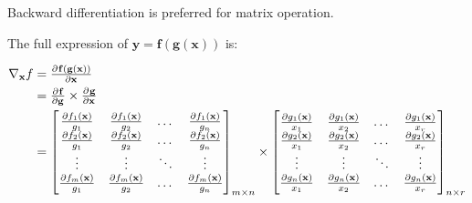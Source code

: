 Backward differentiation is preferred for matrix operation.



The full expression of $\mathbf{y}=\mathbf{f}(\mathbf{g}(\mathbf{x}))$ is:

\begin{equation}
\begin{aligned}
	\nabla{}_{\mathbf{x}} f &=  \pd{\mathbf{f}(\mathbf{g}(\mathbf{x}))}{\mathbf{x}} \\
	&= \pd{\mathbf{f}}{\mathbf{g}} \times \pd{\mathbf{g}}{\mathbf{x}} \\
	&= \mleft [ \begin{matrix}
\frac{\partial f_1({\mathbf{x}})}{g_1} & \frac{\partial f_1({\mathbf{x}})}{g_2} & \dots & \frac{\partial f_1({\mathbf{x}})}{g_n} \\
\frac{\partial f_2({\mathbf{x}})}{g_1} & \frac{\partial f_2({\mathbf{x}})}{g_2} & \dots & \frac{\partial f_2({\mathbf{x}})}{g_n} \\
\vdots & \vdots & \ddots & \vdots  \\
\frac{\partial f_m({\mathbf{x}})}{g_1} & \frac{\partial f_m({\mathbf{x}})}{g_2} & \dots & \frac{\partial f_m({\mathbf{x}})}{g_n}
\end{matrix} \mright ]_{m \times n}
\times %
\mleft [ \begin{matrix}
\frac{\partial g_1({\mathbf{x}})}{x_1} & \frac{\partial g_1({\mathbf{x}})}{x_2} & \dots & \frac{\partial g_1({\mathbf{x}})}{x_r} \\
\frac{\partial g_2({\mathbf{x}})}{x_1} & \frac{\partial g_2({\mathbf{x}})}{x_2} & \dots & \frac{\partial g_2({\mathbf{x}})}{x_r} \\
\vdots & \vdots & \ddots & \vdots  \\
\frac{\partial g_n({\mathbf{x}})}{x_1} & \frac{\partial g_n({\mathbf{x}})}{x_2} & \dots & \frac{\partial g_n({\mathbf{x}})}{x_r}
\end{matrix} \mright ]_{n \times r}
\end{aligned}
\end{equation}
